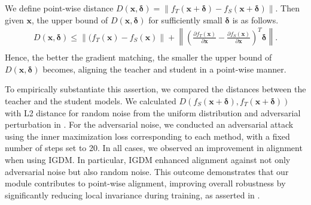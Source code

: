 \documentclass{article} %
\begin{document}
We define point-wise distance $D(\mathbf{x},\boldsymbol{\delta}) = \lVert f_{T}(\mathbf{x} + \boldsymbol{\delta}) - f_S(\mathbf{x} + \boldsymbol{\delta}) \rVert $.
Then given $\mathbf{x}$, the upper bound of $D(\mathbf{x},\boldsymbol{\delta})$ for sufficiently small $\boldsymbol{\delta}$ is as follows.
\begin{equation}\label{dpoint}
\begin{split}
    D(\mathbf{x},\boldsymbol{\delta}) \leq \left \lVert(f_{T}(\mathbf{x}) - f_{S}(\mathbf{x}) \right \rVert  + \left \lVert \left (\frac{\partial f_{T}(\textbf{x})}{\partial \textbf{x}} - \frac{\partial f_{S}(\textbf{x})}{\partial \textbf{x}}\right )^T \boldsymbol{\delta} \right \rVert. \\  
\end{split}
\end{equation}
Hence, the better the gradient matching, the smaller the upper bound of $D(\mathbf{x},\boldsymbol{\delta})$ becomes, aligning the teacher and student in a point-wise manner.

To empirically substantiate this assertion, we compared the distances between the teacher and the student models.
We calculated $D(f_S(\mathbf{x} + \boldsymbol{\delta}), f_T(\mathbf{x} + \boldsymbol{\delta})) $ with L2 distance for random noise from the uniform distribution and adversarial perturbation in .
For the adversarial noise, we conducted an adversarial attack using the inner maximization loss corresponding to each method, with a fixed number of steps set to 20.
In all cases, we observed an improvement in alignment when using IGDM.
In particular, IGDM enhanced alignment against not only adversarial noise but also random noise.
This outcome demonstrates that our module contributes to point-wise alignment, improving overall robustness by significantly reducing local invariance during training, as asserted in \cite{adaad}.



\end{document}

